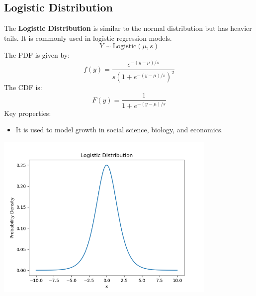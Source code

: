 \documentclass{article}
\begin{document}
\subsection{Logistic Distribution}
The \textbf{Logistic Distribution} is similar to the normal distribution but has heavier tails. It is commonly used in logistic regression models.
\[
Y \sim \text{Logistic}(\mu, s)
\]
The PDF is given by:
\[
f(y) = \frac{e^{-(y-\mu)/s}}{s{(1 + e^{-(y-\mu)/s})}^2}
\]
The CDF is:
\[
F(y) = \frac{1}{1 + e^{-(y-\mu)/s}}
\]
Key properties:
\begin{itemize}
    \item It is used to model growth in social science, biology, and economics.
\end{itemize}
\begin{center}
    \includegraphics[width=0.8\textwidth]{./graphs/probDist/logistic_distribution.png}
\end{center}
\end{document}

